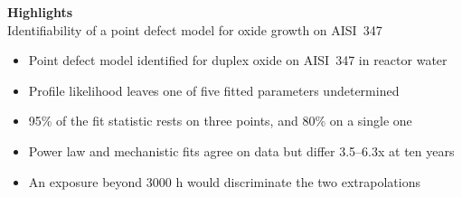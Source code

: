 \documentclass[11pt]{article}
\begin{document}
\begin{center}
{\large\bfseries Highlights}\\[2pt]
Identifiability of a point defect model for oxide growth on AISI~347
\end{center}

\begin{itemize}[leftmargin=1.4em,itemsep=4pt]
\item Point defect model identified for duplex oxide on AISI~347 in reactor water
\item Profile likelihood leaves one of five fitted parameters undetermined
\item 95\% of the fit statistic rests on three points, and 80\% on a single one
\item Power law and mechanistic fits agree on data but differ 3.5--6.3x at ten years
\item An exposure beyond 3000 h would discriminate the two extrapolations
\end{itemize}
\end{document}
